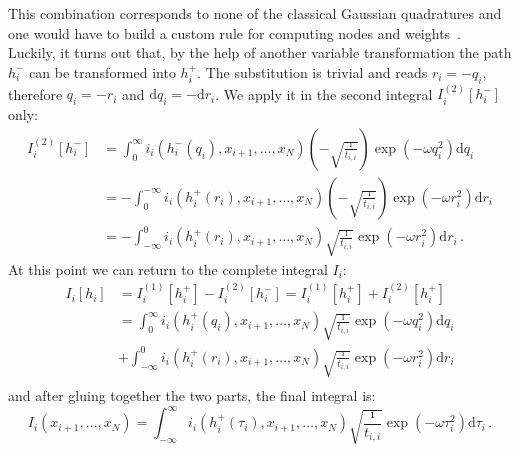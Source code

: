 \documentclass[a4paper,10pt]{article}
\begin{document}
This combination corresponds to none of the classical Gaussian quadratures
and one would have to build a custom rule for computing nodes and weights~\cite{Shizgal}.
Luckily, it turns out that, by the help of another variable transformation
the path $h_i^{-}$ can be transformed into $h_i^{+}$. The substitution
is trivial and reads $r_i = -q_i$, therefore $q_i = -r_i$ and
$\mathrm{d}q_i = -\mathrm{d}r_i$. We apply it in the second integral
$I_i^{(2)}[h_i^{-}]$ only:
\begin{equation}
\begin{split}
  I_i^{(2)}[h_i^{-}] & =
  \int_0^\infty
    i_i\left(h_i^{-}\left(q_i\right), x_{i+1},\ldots,x_N\right)
    \left(-\sqrt{\frac{\imath}{t_{i,i}}}\right)
    \exp\left(- \omega q_i^2\right)
  \mathrm{d}q_i \\
  & =
  - \int_0^{-\infty}
    i_i\left(h_i^{+}\left(r_i\right), x_{i+1},\ldots,x_N\right)
    \left(-\sqrt{\frac{\imath}{t_{i,i}}}\right)
    \exp\left(- \omega r_i^2\right)
  \mathrm{d}r_i \\
  & =
  - \int_{-\infty}^0
    i_i\left(h_i^{+}\left(r_i\right), x_{i+1},\ldots,x_N\right)
    \sqrt{\frac{\imath}{t_{i,i}}}
    \exp\left(- \omega r_i^2\right)
  \mathrm{d}r_i \,.
\end{split}
\end{equation}
At this point we can return to the complete integral $I_i$:
\begin{equation}
\begin{split}
  I_i[h_i] & = I_i^{(1)}[h_i^{+}] - I_i^{(2)}[h_i^{-}] = I_i^{(1)}[h_i^{+}] + I_i^{(2)}[h_i^{+}] \\
  & = \int_0^\infty
    i_i\left(h_i^{+}\left(q_i\right), x_{i+1},\ldots,x_N\right)
    \sqrt{\frac{\imath}{t_{i,i}}}
    \exp\left(- \omega q_i^2\right)
  \mathrm{d}q_i \\
  & +
  \int_{-\infty}^0
    i_i\left(h_i^{+}\left(r_i\right), x_{i+1},\ldots,x_N\right)
    \sqrt{\frac{\imath}{t_{i,i}}}
    \exp\left(- \omega r_i^2\right)
  \mathrm{d}r_i \\
\end{split}
\end{equation}
and after gluing together the two parts, the final integral is:
\begin{equation}
  I_i\left(x_{i+1},\ldots,x_N\right) =
  \int_{-\infty}^\infty
    i_i\left(h_i^{+}\left(\tau_i\right), x_{i+1},\ldots,x_N\right)
    \sqrt{\frac{\imath}{t_{i,i}}}
    \exp\left(- \omega \tau_i^2\right)
  \mathrm{d}\tau_i \,.
\end{equation}
\end{document}
